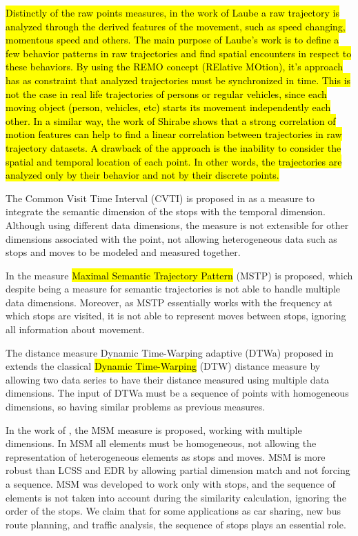 \documentclass[12pt]{article}
\begin{document}
\hl{Distinctly of the raw points measures, in the work of Laube {\cite{Laube2005}} a raw trajectory is analyzed through the derived features of the movement, such as speed changing, momentous speed and others. The main purpose of Laube's work is to define a few behavior patterns in raw trajectories and find spatial encounters in respect to these behaviors. By using the REMO concept (RElative MOtion), it's approach has as constraint that analyzed trajectories must be synchronized in time. This is not the case in real life trajectories of persons or regular vehicles, since each moving object (person, vehicles, etc) starts its movement independently each other. In a similar way, the work of Shirabe {\cite{Shirabe2006}} shows that a strong correlation of motion features can help to find a linear correlation between trajectories in raw trajectory datasets. A drawback of the approach is the inability to consider the spatial and temporal location of each point. In other words, the trajectories are analyzed only by their behavior and not by their discrete points.}

The Common Visit Time Interval (CVTI) is proposed in \cite{Kang:2009:SMT:1529282.1529580} as a measure to integrate the semantic dimension of the stops with the temporal dimension. Although using different data dimensions, the measure is not extensible for other dimensions associated with the point, not allowing heterogeneous data such as stops and moves to be modeled and measured together.

In \cite{Ying:2010:MUS:1867699.1867703} the measure \hl{Maximal Semantic Trajectory Pattern} (MSTP) is proposed, which despite being a measure for semantic trajectories is not able to handle multiple data dimensions. Moreover, as MSTP essentially works with the frequency at which stops are visited, it is not able to represent moves between stops, ignoring all information about movement.

The distance measure Dynamic Time-Warping adaptive (DTWa) proposed in \cite{Shokoohi-Yekta2017} extends the classical \hl{Dynamic Time-Warping} (DTW) \cite{berndt1994using} distance measure by allowing two data series to have their distance measured using multiple data dimensions. The input of DTWa must be a sequence of points with homogeneous dimensions, so having similar problems as previous measures.

In the work of \cite{Furtado:TGIS12156}, the MSM measure is proposed, working with multiple dimensions. In MSM all elements must be homogeneous, not allowing the representation of heterogeneous elements as stops and moves. MSM is more robust than LCSS and EDR by allowing partial dimension match and not forcing a sequence. MSM was developed to work only with stops, and the sequence of elements is not taken into account during the similarity calculation, ignoring the order of the stops. We claim that for some applications as car sharing, new bus route planning, and traffic analysis, the sequence of stops plays an essential role.
\end{document}
